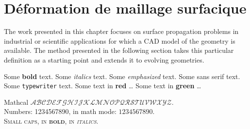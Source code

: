 \def\chapterabstract{In this chapter, we present a set of methods designed for tracking with high-order accuracy the propagation of surfaces in three dimensions with arbitrary geometric and topological complexity. Targeted applications are engineering and scientific problems for which a CAD (computer-aided design) model of the geometry is available, i.e. surface patches with high-order parameterizations as well as topological connectivity. Our method uses and maintains such a representation throughout the propagation. Validity of the dynamic boundary-representation model is ensured by handling geometric singularities. Examples are presented to demonstrate the accuracy of the pseudo-spectral method used for tracking each surface patch.
A strategy for deriving a dynamic surface mesh is finally proposed for applications such as Finite Element/Volume computations with body-fitted volume grids in domains with deforming boundaries. }

\chapter{Déformation de maillage surfacique}

\printskip
\printchapapp
The work presented in this chapter focuses on surface propagation problems in industrial or scientific applications for which a CAD model of the geometry is available. The method presented in the following section takes this particular definition as a starting point and extends it to evolving geometries. \par

Some \textbf{bold} text. Some \textit{italics} text. Some \emph{emphasized} text. Some \textsf{sans serif} text. Some \texttt{typewriter} text. {\color{myred} Some text in \textbf{red} \ldots} {\color{mygreen} Some text in \textbf{green} \ldots} \par
Mathcal $\mathcal{ABCDEFGHIJKLMNOPQRSTUVWXYZ}$.\\
Numbers: 1234567890, in math mode: $1234567890$.\\
{\scshape Small caps, in \textbf{bold}, in \textit{italics}.}

